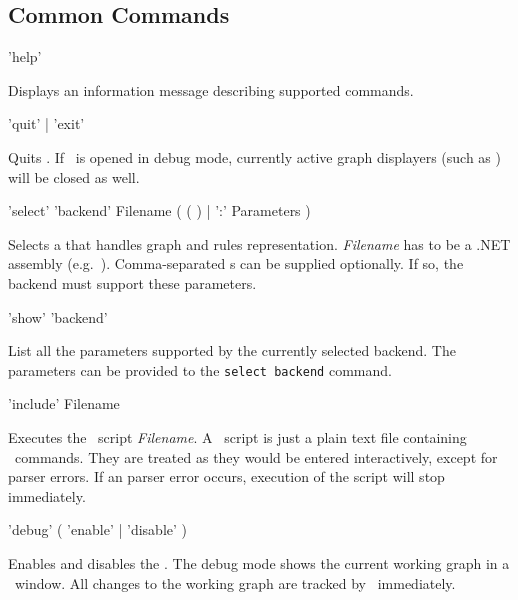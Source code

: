 \subsection{Common Commands}
\label{commcommands}
\begin{rail}
  'help'
\end{rail}
Displays an information message describing supported commands. 

\begin{rail}
  'quit' | 'exit'
\end{rail}
Quits \GrShell. If \GrShell\ is opened in debug mode, currently active graph displayers (such as \yComp) will be closed as well.

\begin{rail}
  'select' 'backend' Filename ( ( ) | ':' Parameters )
\end{rail}
Selects a  that handles graph and rules representation. \emph{Filename} has to be a .NET assembly (e.g.\ \texttt{}).
Comma-separated s can be supplied optionally. If so, the backend must support these parameters.

\begin{rail}
  'show' 'backend'
\end{rail}
List all the parameters supported by the currently selected backend. The parameters can be provided to the \texttt{select backend} command.

\begin{rail}
  'include' Filename
\end{rail}
Executes the \GrShell\ script \emph{Filename}. A \GrShell\ script is just a plain text file containing \GrShell\ commands. They are treated as they would be entered interactively, except for parser errors. If an parser error occurs, execution of the script will stop immediately.

\begin{rail}
  'debug' ( 'enable' | 'disable' )
\end{rail}
Enables and disables the . The debug mode shows the current working graph in a \yComp\ window. All changes to the working graph are tracked by \yComp\ immediately.  

